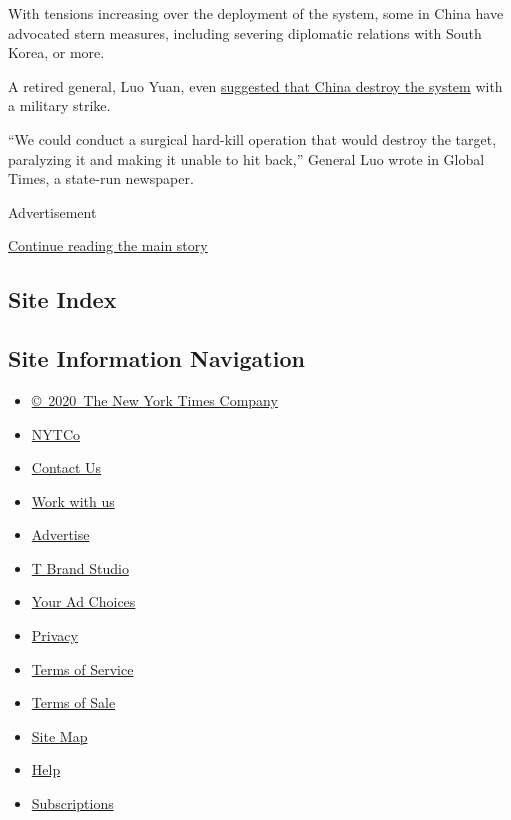 With tensions increasing over the deployment of the system, some in
China have advocated stern measures, including severing diplomatic
relations with South Korea, or more.

A retired general, Luo Yuan, even
\href{https://www.nytimes.com/2017/03/02/world/asia/china-north-south-korea.html}{suggested
that China destroy the system} with a military strike.

``We could conduct a surgical hard-kill operation that would destroy the
target, paralyzing it and making it unable to hit back,'' General Luo
wrote in Global Times, a state-run newspaper.

Advertisement

\protect\hyperlink{after-bottom}{Continue reading the main story}

\hypertarget{site-index}{%
\subsection{Site Index}\label{site-index}}

\hypertarget{site-information-navigation}{%
\subsection{Site Information
Navigation}\label{site-information-navigation}}

\begin{itemize}
\tightlist
\item
  \href{https://help.nytimes.com/hc/en-us/articles/115014792127-Copyright-notice}{©~2020~The
  New York Times Company}
\end{itemize}

\begin{itemize}
\tightlist
\item
  \href{https://www.nytco.com/}{NYTCo}
\item
  \href{https://help.nytimes.com/hc/en-us/articles/115015385887-Contact-Us}{Contact
  Us}
\item
  \href{https://www.nytco.com/careers/}{Work with us}
\item
  \href{https://nytmediakit.com/}{Advertise}
\item
  \href{http://www.tbrandstudio.com/}{T Brand Studio}
\item
  \href{https://www.nytimes.com/privacy/cookie-policy\#how-do-i-manage-trackers}{Your
  Ad Choices}
\item
  \href{https://www.nytimes.com/privacy}{Privacy}
\item
  \href{https://help.nytimes.com/hc/en-us/articles/115014893428-Terms-of-service}{Terms
  of Service}
\item
  \href{https://help.nytimes.com/hc/en-us/articles/115014893968-Terms-of-sale}{Terms
  of Sale}
\item
  \href{https://spiderbites.nytimes.com}{Site Map}
\item
  \href{https://help.nytimes.com/hc/en-us}{Help}
\item
  \href{https://www.nytimes.com/subscription?campaignId=37WXW}{Subscriptions}
\end{itemize}
